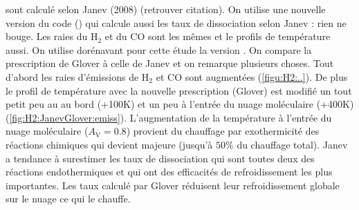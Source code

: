 sont calculé selon Janev (2008) (retrouver citation). On utilise une nouvelle version du code (\unsept) qui calcule aussi les taux de dissociation selon Janev : rien ne bouge. Les raies du $\mathrm{H}_2$ et du $\mathrm{CO}$ sont les mêmes et le profils de température aussi. On utilise dorénavant pour cette étude la version \unsept. On compare la prescription de Glover à celle de Janev et on remarque plusieurs choses. Tout d'abord les raies d'émissions de $\mathrm{H}_2$ et $\mathrm{CO}$ sont augmentées (\autoref{figu:H2:..}). De plus le profil de température avec la nouvelle prescription (Glover) est modifié un tout petit peu au au bord (+100K) et un peu à l'entrée du nuage moléculaire (+400K) (\autoref{fig:H2:JanevGlover:emiss}). L'augmentation de la température à l'entrée du nuage moléculaire ($A_\mathrm{V} = 0.8$) provient du chauffage par exothermicité des réactions chimiques qui devient majeure (jusqu'à $50\%$ du chauffage total). Janev a tendance à surestimer les taux de dissociation qui sont toutes deux des réactions endothermiques et qui ont des efficacités de refroidissement les plus importantes. Les taux calculé par Glover réduisent leur refroidissement globale sur le nuage ce qui le chauffe. \newline 


